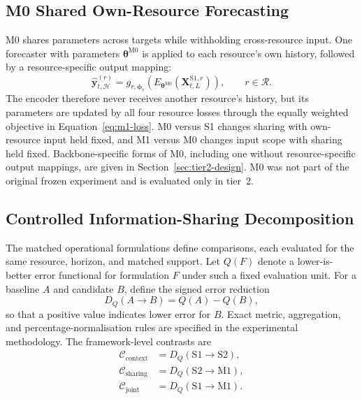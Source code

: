 \documentclass[5p,twocolumn]{elsarticle}
\begin{document}
\subsection{M0 Shared Own-Resource Forecasting}
\label{sec:m0}

M0 shares parameters across targets while withholding cross-resource input.
One forecaster with parameters $\boldsymbol{\theta}^{\mathrm{M0}}$ is applied
to each resource's own history, followed by a resource-specific output
mapping:
\begin{equation}
  \widehat{\mathbf{y}}_{t,\mathcal{H}}^{(r)}
  = g_{r,\boldsymbol{\phi}_r}\!\left(
      E_{\boldsymbol{\theta}^{\mathrm{M0}}}
      (\mathbf{X}_{t,L}^{\mathrm{S1},r})\right),
  \qquad r\in\mathcal{R}.
  \label{eq:m0-forecast}
\end{equation}
The encoder therefore never receives another resource's history, but its
parameters are updated by all four resource losses through the equally
weighted objective in Equation~\ref{eq:m1-loss}. M0 versus S1 changes sharing
with own-resource input held fixed, and M1 versus M0 changes input scope with
sharing held fixed. Backbone-specific forms of M0, including one without
resource-specific output mappings, are given in
Section~\ref{sec:tier2-design}. M0 was not part of the original frozen
experiment and is evaluated only in tier~2.

\subsection{Controlled Information-Sharing Decomposition}
\label{sec:decomposition}

The matched operational formulations define comparisons, each evaluated for the same
resource, horizon, and matched support. Let $Q(F)$ denote a lower-is-better
error functional for formulation $F$ under such a fixed evaluation unit. For
a baseline $A$ and candidate $B$, define the signed error reduction
\begin{equation}
  D_Q(A\rightarrow B)=Q(A)-Q(B),
  \label{eq:controlled-reduction}
\end{equation}
so that a positive value indicates lower error for $B$. Exact metric,
aggregation, and percentage-normalisation rules are specified in the
experimental methodology. The framework-level contrasts are
\begin{equation}
  \begin{aligned}
    \mathcal{C}_{\mathrm{context}}
      &= D_Q(\mathrm{S1}\rightarrow\mathrm{S2}), \\
    \mathcal{C}_{\mathrm{sharing}}
      &= D_Q(\mathrm{S2}\rightarrow\mathrm{M1}), \\
    \mathcal{C}_{\mathrm{joint}}
      &= D_Q(\mathrm{S1}\rightarrow\mathrm{M1}).
  \end{aligned}
  \label{eq:controlled-contrasts}
\end{equation}
\end{document}
